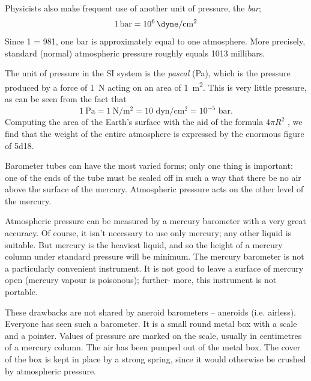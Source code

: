 Physicists also make frequent use of another unit of pressure, the \emph{bar}; 
\begin{equation*}%
\SI{1}{\bar} =\SI{d6}{\dyne\per\centi\meter\squared}
\end{equation*}
 Since \SI{1}{\gf} = \SI{981}{\dyne}, one bar is approximately equal to one atmosphere. More precisely, standard (normal) atmospheric pressure roughly equals 1013 millibars.
 
The unit of pressure in the SI system is the \emph{pascal} (\si{\pascal}), which is the pressure produced by a force of \SI{1}{\newton} acting on an area of \SI{1}{\meter\squared}. This is very little pressure, as can be seen from the fact that 
\begin{equation*}%
\SI{1}{\pascal} = \SI{1}{\newton\per\metre\squared} = 10\,\,\textrm{dyn}/ \si{\centi\metre\squared} = 10^{-5}\,\, \textrm{bar}.
\end{equation*}
Computing the area of the Earth's surface with the aid of the formula $4 \pi R^{2}$ , we find that the weight of the entire atmosphere is expressed by the enormous figure of \SI{5d18}{\kgf}.

Barometer tubes can have the most varied forms; only one thing is important: one of the ends of the tube must be sealed off in such a way that there be no air above the surface of the mercury. Atmospheric pressure acts on the other level of the mercury.

Atmospheric pressure can be measured by a mercury
barometer with a very great accuracy. Of course, it isn't
necessary to use only mercury; any other liquid is suitable.
But mercury is the heaviest liquid, and so the height
of a mercury column under standard pressure will be
minimum. The mercury barometer is not a particularly
convenient instrument. It is not good to leave a surface
of mercury open (mercury vapour is poisonous); further-
more, this instrument is not portable.

These drawbacks are not shared by aneroid barometers -- aneroids (i.e. airless). Everyone has seen such a barometer. It is a small round metal box with a scale and a pointer. Values of pressure are marked on the scale, usually in centimetres of a mercury column. The air has been pumped out of the metal box. The cover of the box is kept in place by a strong spring, since it would otherwise be crushed by atmospheric pressure.


